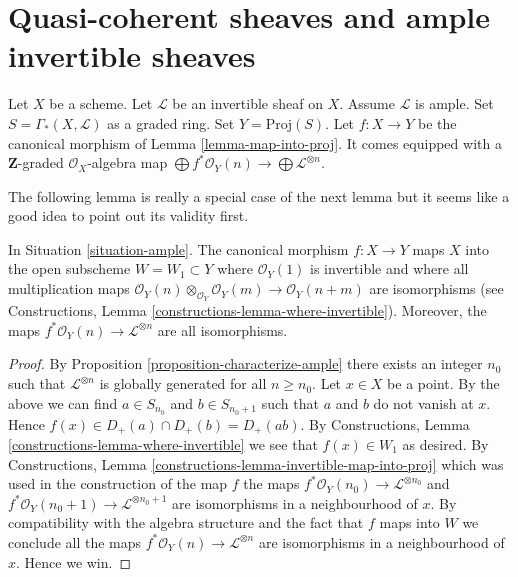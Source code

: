 \section{Quasi-coherent sheaves and ample invertible sheaves}
\label{section-ample-quasi-coherent}


\begin{situation}
\label{situation-ample}
Let $X$ be a scheme.
Let $\mathcal{L}$ be an invertible sheaf on $X$.
Assume $\mathcal{L}$ is ample.
Set $S = \Gamma_*(X, \mathcal{L})$ as a graded ring.
Set $Y = \text{Proj}(S)$.
Let $f : X \to Y$ be the canonical morphism of Lemma \ref{lemma-map-into-proj}.
It comes equipped with a $\mathbf{Z}$-graded $\mathcal{O}_X$-algebra map
$\bigoplus f^*\mathcal{O}_Y(n) \to \bigoplus \mathcal{L}^{\otimes n}$.
\end{situation}

\noindent
The following lemma is really a special case of the next lemma
but it seems like a good idea to point out its validity first.

\begin{lemma}
\label{lemma-ample-gcd-is-one}
In Situation \ref{situation-ample}.
The canonical morphism $f : X \to Y$
maps $X$ into the open subscheme $W = W_1 \subset Y$
where $\mathcal{O}_Y(1)$ is invertible and where 
all multiplication maps
$\mathcal{O}_Y(n) \otimes_{\mathcal{O}_Y} \mathcal{O}_Y(m) \to
\mathcal{O}_Y(n + m)$
are isomorphisms (see
Constructions, Lemma \ref{constructions-lemma-where-invertible}).
Moreover, the maps $f^*\mathcal{O}_Y(n) \to \mathcal{L}^{\otimes n}$
are all isomorphisms.
\end{lemma}

\begin{proof}
By Proposition \ref{proposition-characterize-ample} there exists an integer
$n_0$ such that $\mathcal{L}^{\otimes n}$ is globally generated for all
$n \geq n_0$. Let $x \in X$ be a point. By the above we can find 
$a \in S_{n_0}$ and $b \in S_{n_0 + 1}$ such that
$a$ and $b$ do not vanish at $x$. Hence
$f(x) \in D_{+}(a) \cap D_{+}(b) = D_{+}(ab)$. By
Constructions, Lemma \ref{constructions-lemma-where-invertible}
we see that $f(x) \in W_1$ as desired. By
Constructions, Lemma \ref{constructions-lemma-invertible-map-into-proj}
which was used in the construction of the map $f$
the maps
$f^*\mathcal{O}_Y(n_0) \to \mathcal{L}^{\otimes n_0}$ and
$f^*\mathcal{O}_Y(n_0 + 1) \to \mathcal{L}^{\otimes n_0 + 1}$
are isomorphisms in a neighbourhood of $x$. By compatibility with
the algebra structure and the fact that $f$ maps into $W$
we conclude all the maps
$f^*\mathcal{O}_Y(n) \to \mathcal{L}^{\otimes n}$ are isomorphisms
in a neighbourhood of $x$. Hence we win.
\end{proof}

